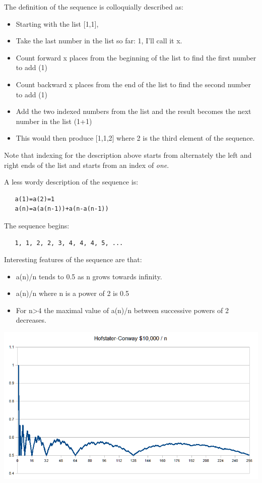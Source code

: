 \begin{itemize}
The definition of the sequence is colloquially described as:

\begin{itemize}
\item
  Starting with the list {[}1,1{]},
\item
  Take the last number in the list so far: 1, I'll call it x.
\item
  Count forward x places from the beginning of the list to find the
  first number to add (1)
\item
  Count backward x places from the end of the list to find the second
  number to add (1)
\item
  Add the two indexed numbers from the list and the result becomes the
  next number in the list (1+1)
\item
  This would then produce {[}1,1,2{]} where 2 is the third element of
  the sequence.
\end{itemize}

Note that indexing for the description above starts from alternately the
left and right ends of the list and starts from an index of \emph{one}.

A less wordy description of the sequence is:

\begin{verbatim}
   a(1)=a(2)=1
   a(n)=a(a(n-1))+a(n-a(n-1))
\end{verbatim}

The sequence begins:

\begin{verbatim}
   1, 1, 2, 2, 3, 4, 4, 4, 5, ...
\end{verbatim}

Interesting features of the sequence are that:

\begin{itemize}
\item
  a(n)/n tends to 0.5 as n grows towards infinity.
\item
  a(n)/n where n is a power of 2 is 0.5
\item
  For n\textgreater{}4 the maximal value of a(n)/n between successive
  powers of 2 decreases.
\end{itemize}

\emph{\includegraphics[scale=.6]{graphics/Hofstadter_conway_10K.gif}}


\end{itemize}
